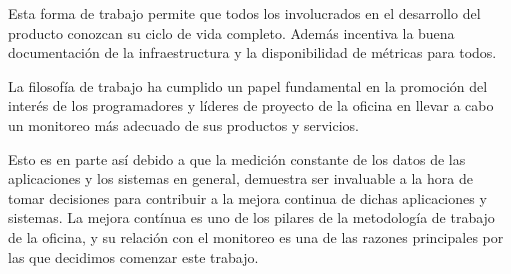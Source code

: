 Esta forma de trabajo permite que todos los involucrados en el desarrollo del
producto conozcan su ciclo de vida completo. Además incentiva la buena
documentación de la infraestructura y la disponibilidad de métricas para todos.

La filosofía de trabajo ha cumplido un papel fundamental en la promoción del
interés de los programadores y líderes de proyecto de la oficina en llevar a
cabo un monitoreo más adecuado de sus productos y servicios.

Esto es en parte así debido a que la medición constante de los datos de las
aplicaciones y los sistemas en general, demuestra ser invaluable a la hora de
tomar decisiones para contribuir a la mejora continua de dichas aplicaciones y
sistemas. La mejora contínua es uno de los pilares de la metodología de trabajo
de la oficina, y su relación con el monitoreo es una de las razones principales
por las que decidimos comenzar este trabajo.
